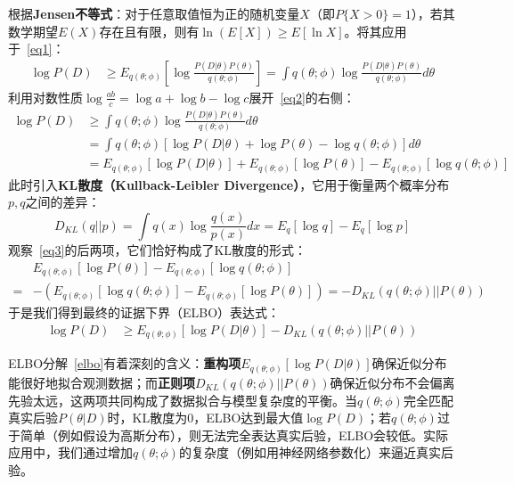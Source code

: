 根据\textbf{Jensen不等式}：对于任意取值恒为正的随机变量$X$（即$P\{X>0\}=1$），若其数学期望$E(X)$存在且有限，则有$\ln(E[X]) \ge E[\ln X]$。将其应用于~\eqref{eq1}：
\begin{align}\label{eq2}
        \log P(D)  &\geq E_{q(\theta;\phi)}\left[\log\frac{P(D|\theta)P(\theta)}{q(\theta;\phi)}\right]
          = \int q(\theta;\phi)\log\frac{P(D|\theta)P(\theta)}{q(\theta;\phi)}d\theta
\end{align}
利用对数性质$\log\frac{ab}{c} = \log a + \log b - \log c$展开~\eqref{eq2}的右侧：
\begin{align}\label{eq3}
        \log P(D)  &\geq    \int q(\theta;\phi)\log\frac{P(D|\theta)P(\theta)}{q(\theta;\phi)}d\theta \nonumber  \\
                   &=    \int q(\theta;\phi)[ \log{P(D|\theta)} + \log P(\theta)-\log q(\theta;\phi)] d\theta \nonumber \\
        &= E_{q(\theta;\phi)}[\log P(D|\theta)] + E_{q(\theta;\phi)}[\log P(\theta)] - E_{q(\theta;\phi)}[\log q(\theta;\phi)]
\end{align}
此时引入\textbf{KL散度（Kullback-Leibler Divergence）}，它用于衡量两个概率分布$p,q$之间的差异：
$$ D_{KL}(q||p) = \int q(x)\log\frac{q(x)}{p(x)}dx = E_q[\log q] - E_q[\log p] $$
观察~\eqref{eq3}的后两项，它们恰好构成了KL散度的形式：
\begin{align*}
& E_{q(\theta;\phi)}[\log P(\theta)] - E_{q(\theta;\phi)}[\log q(\theta;\phi)] \\
=&- \left(E_{q(\theta;\phi)}[\log q(\theta;\phi)]-  E_{q(\theta;\phi)}[\log P(\theta)]  \right) =- D_{KL}(q(\theta;\phi)||P(\theta))
\end{align*}
于是我们得到最终的证据下界（ELBO）表达式：
\begin{align}\label{elbo}
\log P(D) &\geq  E_{q(\theta;\phi)}[\log P(D|\theta)] - D_{KL}(q(\theta;\phi)||P(\theta))
\end{align}

ELBO分解~\eqref{elbo}有着深刻的含义：\textbf{重构项}$E_{q(\theta;\phi)}[\log P(D|\theta)]$确保近似分布能很好地拟合观测数据；而\textbf{正则项}$D_{KL}(q(\theta;\phi)||P(\theta))$确保近似分布不会偏离先验太远，这两项共同构成了数据拟合与模型复杂度的平衡。当$q(\theta;\phi)$完全匹配真实后验$P(\theta|D)$时，KL散度为0，ELBO达到最大值$\log P(D)$；若$q(\theta;\phi)$过于简单（例如假设为高斯分布），则无法完全表达真实后验，ELBO会较低。实际应用中，我们通过增加$q(\theta;\phi)$的复杂度（例如用神经网络参数化）来逼近真实后验。


